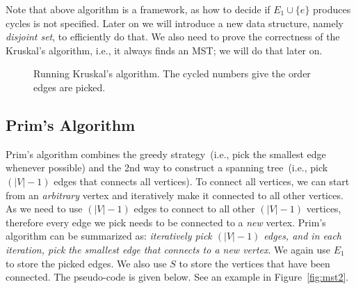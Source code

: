 \begin{algorithmblock}[0.8\textwidth]
	\xxx
	\xxx
	\xxx
	\xxx
	\xxx
	\xxx
	\xxx
\end{algorithmblock}

Note that above algorithm is a framework, as how to decide if $E_1\cup\{e\}$
produces cycles is not specified. Later on we will introduce a new data
structure, namely \emph{disjoint set}, to efficiently do that.
We also need to prove the correctness of the Kruskal's algorithm, i.e.,
it always finds an MST; we will do that later on.

\begin{figure}[h]
\centering{}
\caption{Running Kruskal's algorithm. The cycled numbers give the order edges are picked.}
\label{fig:mst1}
\end{figure}

\subsection*{Prim's Algorithm}

Prim's algorithm combines the greedy strategy~(i.e., pick the smallest edge whenever possible)
and the 2nd way to construct a spanning tree~(i.e., pick $(|V|-1)$ edges that connects all vertices).
To connect all vertices, we can start from an \emph{arbitrary} vertex and iteratively
make it connected to all other vertices. As we need to use $(|V| - 1)$ edges to connect
to all other $(|V|-1)$ vertices, therefore every edge we pick needs to be connected to a
\emph{new} vertex.
Prim's algorithm can be summarized as: \emph{iteratively pick $(|V|-1)$ edges,
and in each iteration, pick the smallest edge that connects to a new vertex}.
We again use $E_1$ to store the picked edges.
We also use $S$ to store the vertices that have been connected.
The pseudo-code is given below.  See an example in Figure~\ref{fig:mst2}.

\begin{algorithmblock}[0.8\textwidth]
	\xxx
	\xxx
	\xxx
	\xxx
	\xxx
	\xxx
	\xxx
\end{algorithmblock}

